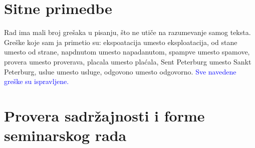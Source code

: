 \documentclass[a4paper]{report}
\newcommand{\odgovor}[1]{\textcolor{blue}{#1}}
\begin{document}
\section{Sitne primedbe}
Rad ima mali broj grešaka u pisanju, što ne utiče na razumevanje samog teksta. Greške koje sam ja primetio su: ekspoatacija umesto eksploatacija, od stane umesto od strane, napdnutom umesto napadanutom, spampve umesto spamove‚ provera umesto proverava, placala umesto plaćala, Sent Peterburg umesto Sankt Peterburg, uslue umesto usluge, odgovono umesto odgovorno.
\odgovor{Sve navedene greške su ispravljene.}

\section{Provera sadržajnosti i forme seminarskog rada}
\end{document}
